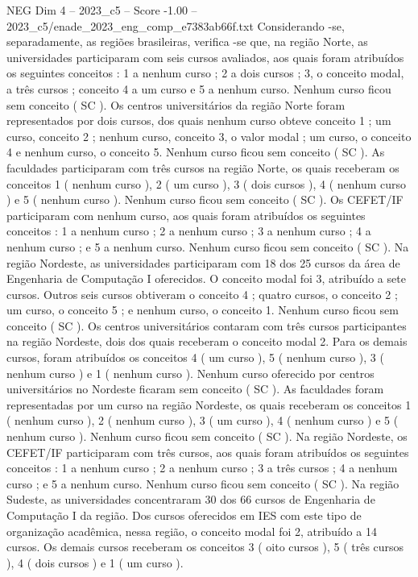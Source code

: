 \begin{textsample}{NEG Dim 4 – 2023\_c5 – Score -1.00 – 2023\_c5/enade\_2023\_eng\_comp\_e7383ab66f.txt}
Considerando -se, separadamente, as regiões brasileiras, verifica -se que, na região Norte, as universidades participaram com seis cursos avaliados, aos quais foram atribuídos os seguintes conceitos : 1 a nenhum curso ; 2 a dois cursos ; 3, o conceito modal, a três cursos ; conceito 4 a um curso e 5 a nenhum curso.
Nenhum curso ficou sem conceito ( SC ).
Os centros universitários da região Norte foram representados por dois cursos, dos quais nenhum curso obteve conceito 1 ; um curso, conceito 2 ; nenhum curso, conceito 3, o valor modal ; um curso, o conceito 4 e nenhum curso, o conceito 5.
Nenhum curso ficou sem conceito ( SC ).
As faculdades participaram com três cursos na região Norte, os quais receberam os conceitos 1 ( nenhum curso ), 2 ( um curso ), 3 ( dois cursos ), 4 ( nenhum curso ) e 5 ( nenhum curso ).
Nenhum curso ficou sem conceito ( SC ).
Os CEFET/IF participaram com nenhum curso, aos quais foram atribuídos os seguintes conceitos : 1 a nenhum curso ; 2 a nenhum curso ; 3 a nenhum curso ; 4 a nenhum curso ; e 5 a nenhum curso.
Nenhum curso ficou sem conceito ( SC ).
Na região Nordeste, as universidades participaram com 18 dos 25 cursos da área de Engenharia de Computação I oferecidos.
O conceito modal foi 3, atribuído a sete cursos.
Outros seis cursos obtiveram o conceito 4 ; quatro cursos, o conceito 2 ; um curso, o conceito 5 ; e nenhum curso, o conceito 1.
Nenhum curso ficou sem conceito ( SC ).
Os centros universitários contaram com três cursos participantes na região Nordeste, dois dos quais receberam o conceito modal 2.
Para os demais cursos, foram atribuídos os conceitos 4 ( um curso ), 5 ( nenhum curso ), 3 ( nenhum curso ) e 1 ( nenhum curso ).
Nenhum curso oferecido por centros universitários no Nordeste ficaram sem conceito ( SC ).
As faculdades foram representadas por um curso na região Nordeste, os quais receberam os conceitos 1 ( nenhum curso ), 2 ( nenhum curso ), 3 ( um curso ), 4 ( nenhum curso ) e 5 ( nenhum curso ).
Nenhum curso ficou sem conceito ( SC ).
Na região Nordeste, os CEFET/IF participaram com três cursos, aos quais foram atribuídos os seguintes conceitos : 1 a nenhum curso ; 2 a nenhum curso ; 3 a três cursos ; 4 a nenhum curso ; e 5 a nenhum curso.
Nenhum curso ficou sem conceito ( SC ).
Na região Sudeste, as universidades concentraram 30 dos 66 cursos de Engenharia de Computação I da região.
Dos cursos oferecidos em IES com este tipo de organização acadêmica, nessa região, o conceito modal foi 2, atribuído a 14 cursos.
Os demais cursos receberam os conceitos 3 ( oito cursos ), 5 ( três cursos ), 4 ( dois cursos ) e 1 ( um curso ).

\end{textsample}
